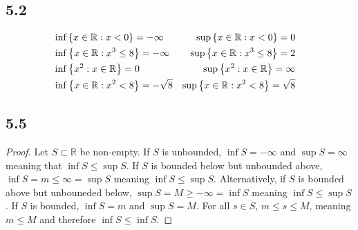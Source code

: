 \documentclass[12pt,titlepage]{extarticle}
\begin{document}
\subsection*{5.2}
\begin{align*}
	& \inf\qty{x \in \mathbb{R} : x < 0} = -\infty & \sup\qty{x \in \mathbb{R} : x < 0} = 0 \\
	& \inf\qty{x \in \mathbb{R} : x^3 \leq 8} = -\infty & \sup\qty{x \in \mathbb{R} : x^3 \leq 8} = 2 \\
	& \inf\qty{x^2 : x \in \mathbb{R}} = 0 & \sup\qty{x^2 : x \in \mathbb{R}} = \infty \\
	& \inf\qty{x \in \mathbb{R} : x^2 < 8} = -\sqrt{8} & \sup\qty{x \in \mathbb{R} : x^2 < 8} = \sqrt{8} &
\end{align*}

\subsection*{5.5}
\begin{proof}
	Let $S \subset \mathbb{R}$ be non-empty. If $S$ is unbounded, $\inf S = -\infty$ and $\sup S = \infty$ meaning that $\inf S \leq \sup S$. If $S$ is bounded below but unbounded above, $\inf S = m \leq \infty = \sup S$ meaning $\inf S \leq \sup S$. Alternatively, if $S$ is bounded above but unbouneded below, $\sup S = M \geq -\infty = \inf S$ meaning $\inf S \leq \sup S$. If $S$ is bounded, $\inf S = m$ and $\sup S = M$. For all $s \in S$, $m \leq s \leq M$, meaning $m \leq M$ and therefore $\inf S \leq \inf S$.
\end{proof}
\end{document}
